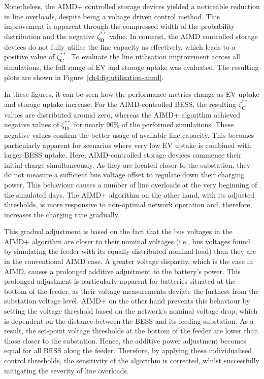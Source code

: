 Nonetheless, the AIMD+ controlled storage devices yielded a noticeable reduction in line overloads, despite being a voltage driven control method.
This improvement is apparent through the compressed width of the probability distribution and the negative $\zeta_\textbf{D}^{**}$ value.
In contrast, the AIMD controlled storage devices do not fully utilise the line capacity as effectively, which leads to a positive value of $\zeta_\textbf{C}^{**}$.
To evaluate the line utilisation improvement across all simulations, the full range of EV and storage uptake was evaluated. The resulting plots are shown in Figure~\ref{ch4:fig:utilisation-aimd}.



In these figures, it can be seen how the performance metrics change as EV uptake and storage uptake increase.
For the AIMD-controlled BESS, the resulting $\zeta_\textbf{C}^{**}$ values are distributed around zero, whereas the AIMD+ algorithm achieved negative values of $\zeta_\textbf{D}^{**}$ for nearly 90\% of the performed simulations.
These negative values confirm the better usage of available line capacity. This becomes particularly apparent for scenarios where very low EV uptake is combined with larger BESS uptake.
Here, AIMD-controlled storage devices commence their initial charge simultaneously.
As they are located closer to the substation, they do not measure a sufficient bus voltage offset to regulate down their charging power.
This behaviour causes a number of line overloads at the very beginning of the simulated days.
The AIMD+ algorithm on the other hand, with its adjusted thresholds, is more responsive to non-optimal network operation and, therefore, increases the charging rate gradually.



This gradual adjustment is based on the fact that the bus voltages in the AIMD+ algorithm are closer to their nominal voltages (i.e., bus voltages found by simulating the feeder with its equally-distributed nominal load) than they are in the conventional AIMD case.
A greater voltage disparity, which is the case in AIMD, causes a prolonged additive adjustment to the battery's power.
This prolonged adjustment is particularly apparent for batteries situated at the bottom of the feeder, as their voltage measurements deviate the furthest from the substation voltage level.
AIMD+ on the other hand prevents this behaviour by setting the voltage threshold based on the network's nominal voltage drop, which is dependent on the distance between the BESS and its feeding substation.
As a result, the set-point voltage thresholds at the bottom of the feeder are lower than those closer to the substation.
Hence, the additive power adjustment becomes equal for all BESS along the feeder.
Therefore, by applying these individualised control thresholds, the sensitivity of the algorithm is corrected, whilst successfully mitigating the severity of line overloads.

